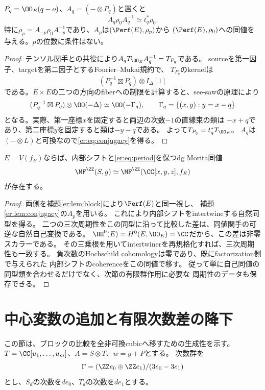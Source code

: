 \begin{lemma}[次数零直線束による共役]\label{er:lem:conjugacy}
$P_q=\OO_E(q-o)$、$A_q=(-\otimes P_q)$と置くと
\begin{equation}\label{er:eq:conjugacy}
 A_q\rho_0A_q^{-1}\simeq t_q^*\rho_0.
\end{equation}
特に$\rho_p=A_{-p}\rho_0A_{-p}^{-1}$であり、$A_p$は$(\Perf(E),\rho_p)$から
$(\Perf(E),\rho_0)$への同値を与える。$p$の位数に条件はない。
\end{lemma}
\begin{proof}
テンソル関手との共役により$A_qT_{\OO_E}A_q^{-1}=T_{P_q}$である。
sourceを第一因子、targetを第二因子とするFourier--Mukai規約で、
$T_{P_q}$のkernelは
\[
 (P_q^{-1}\boxtimes P_q)\otimes I_\Delta[1]
\]
である。$E\times E$の二つの方向のfiberへの制限を計算すると、see-sawの原理により
\[
 (P_q^{-1}\boxtimes P_q)\otimes\OO(-\Delta)
 \simeq\OO(-\Gamma_q),\qquad
 \Gamma_q=\{(x,y):y=x-q\}
\]
となる。実際、第一座標$x$を固定すると両辺の次数$-1$の直線束の類は
$-x+q$であり、第二座標$y$を固定すると類は$-y-q$である。
よって$T_{P_q}=t_q^*T_{\OO_E}$。
$A_q$は$(-\otimes L)$と可換なので\eqref{er:eq:conjugacy}を得る。
\end{proof}

\begin{lemma}[周期性を含むブロック比較]\label{er:lem:periodic-block}
$E=V(f_E)$ならば、内部シフトと\eqref{er:eq:period}を保つdg Morita同値
\[
 \MF^\ZZ(S,g)\simeq\MF^\ZZ(\CC[x,y,z],f_E)
\]
が存在する。
\end{lemma}
\begin{proof}
両側を補題\ref{er:lem:block}により$\Perf(E)$と同一視し、
補題\ref{er:lem:conjugacy}の$A_p$を用いる。
これにより内部シフトをintertwineする自然同型を得る。
二つの三次周期性をこの同型に沿って比較した差は、同値関手の可逆な自然自己変換である。
$\HH^0(E)=H^0(E,\OO_E)=\CC$だから、この差は非零スカラーである。
その三乗根を用いてintertwinerを再規格化すれば、三次周期性も一致する。
負次数のHochschild cohomologyは零であり、既にfactorization側で与えられた
内部シフトのcoherenceをこの同値で移す。
従って単に自己同値の同型類を合わせるだけでなく、次節の有限群作用に必要な
周期性のデータも保存できる。
\end{proof}

\section{中心変数の追加と有限次数差の降下}\label{er:sec:suspension}
この節は、ブロックの比較を全非可換cubicへ移すための生成性を示す。
$T=\CC[u_1,\ldots,u_m]$、$A=S\otimes T$、$w=g+P$とする。
次数群を
\[
 \Gamma=(\ZZ e_0\oplus\ZZ e_1)/(3e_0-3e_1)
\]
とし、$S_d$の次数を$de_0$、$T_d$の次数を$de_1$とする。

